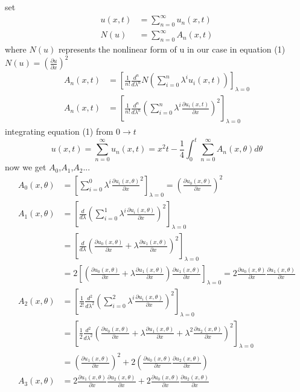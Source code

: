 \documentclass[]{article}
\begin{document}
set
\begin{align*}
    u(x,t) &= \sum_{n=0}^{\infty} u_n(x,t)
\\
N(u) &= \sum_{n=0}^{\infty} A_n(x,t)
\end{align*}
where $N(u)$ represents the nonlinear form of u in our case in equation (1) $N(u) = \left(\frac{\partial u}{\partial x}\right)^2$
\begin{align*}
A_n(x,t) &= \left[\frac{1}{n!} \frac{d^n}{d \lambda^n} N\left(\sum_{i=0}^{n}  \lambda^i u_i(x,t)\right)\right]_{\lambda = 0}
\\
A_n(x,t) &= \left[\frac{1}{n!} \frac{d^n}{d \lambda^n} \left(\sum_{i=0}^{n}  \lambda^i \frac{\partial u_i(x,t)}{\partial x}\right)^2\right]_{\lambda = 0}
\end{align*}
integrating equation (1) from $0 \to t$
\[
    u(x,t) = \sum_{n=0}^{\infty} u_n(x,t)  = x^2t - \frac{1}{4} \int_{0}^{t}\sum_{n=0}^{\infty} A_n(x,\theta) d\theta 
\]
now we get $A_0$,$A_1$,$A_2$...
\begin{align*}
    A_0(x,\theta) &= \left[\sum_{i=0}^{0}  \lambda^i \frac{\partial u_i(x,\theta)}{\partial x}^2\right]_{\lambda = 0} = \left(\frac{\partial u_0(x,\theta)}{\partial x}\right)^2
    \\    
    A_1(x,\theta) &= \left[\frac{d}{d \lambda} \left(\sum_{i=0}^{1}  \lambda^i \frac{\partial u_i(x,\theta)}{\partial x}\right)^2\right]_{\lambda = 0}
    \\  
    &= \left[\frac{d}{d \lambda} \left(\frac{\partial u_0(x,\theta)}{\partial x} + \lambda \frac{\partial u_1(x,\theta)}{\partial x}\right)^2\right]_{\lambda = 0}
    \\
    &=2\left[\left(\frac{\partial u_0(x,\theta)}{\partial x} + \lambda \frac{\partial u_1(x,\theta)}{\partial x}\right)\frac{\partial u_1(x,\theta)}{\partial x}\right]_{\lambda = 0} = 2\frac{\partial u_0(x,\theta)}{\partial x} \frac{\partial u_1(x,\theta)}{\partial x}
    \\
    A_2(x,\theta) &=\left[\frac{1}{2!} \frac{d^2}{d \lambda^2} \left(\sum_{i=0}^{2}  \lambda^i \frac{\partial u_i(x,\theta)}{\partial x}\right)^2\right]_{\lambda = 0}
    \\
    &= \left[\frac{1}{2} \frac{d^2}{d \lambda^2} \left(\frac{\partial u_0(x,\theta)}{\partial x} + \lambda \frac{\partial u_1(x,\theta)}{\partial x} + \lambda^2 \frac{\partial u_2(x,\theta)}{\partial x}\right)^2\right]_{\lambda = 0}
    \\
    &= \left(\frac{\partial u_1(x,\theta)}{\partial x}\right)^2 + 2 \left(\frac{\partial u_0(x,\theta)}{\partial x}\frac{\partial u_2(x,\theta)}{\partial x}\right)
    \\
    A_3(x,\theta) &= 2\frac{\partial u_1(x,\theta)}{\partial x}\frac{\partial u_2(x,\theta)}{\partial x} + 2\frac{\partial u_0(x,\theta)}{\partial x} \frac{\partial u_2(x,\theta)}{\partial x}
\end{align*}
\end{document}

